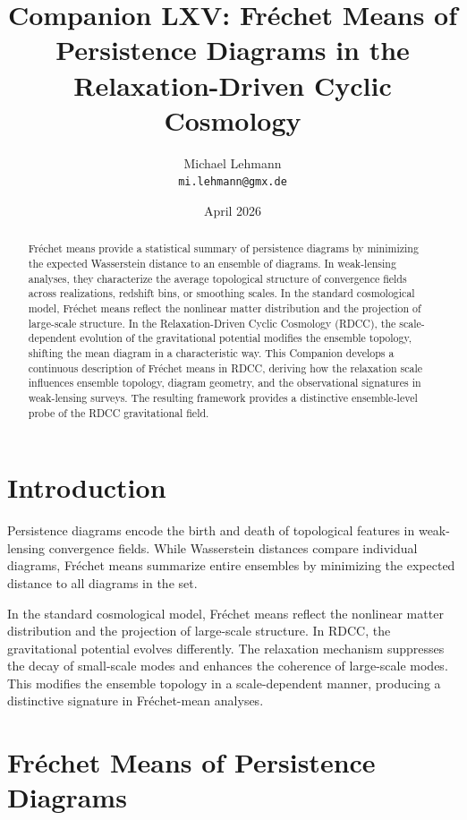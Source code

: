 \documentclass[11pt,a4paper]{article}
\title{\textbf{Companion LXV: Fréchet Means of Persistence Diagrams in the Relaxation-Driven Cyclic Cosmology}}
\author{Michael Lehmann \\ \texttt{mi.lehmann@gmx.de}}
\date{April 2026}
\begin{document}
\maketitle

\begin{abstract}
Fréchet means provide a statistical summary of persistence diagrams by minimizing 
the expected Wasserstein distance to an ensemble of diagrams. In weak-lensing 
analyses, they characterize the average topological structure of convergence 
fields across realizations, redshift bins, or smoothing scales. In the standard 
cosmological model, Fréchet means reflect the nonlinear matter distribution and the 
projection of large-scale structure. In the Relaxation-Driven Cyclic Cosmology 
(RDCC), the scale-dependent evolution of the gravitational potential modifies the 
ensemble topology, shifting the mean diagram in a characteristic way. This 
Companion develops a continuous description of Fréchet means in RDCC, deriving how 
the relaxation scale influences ensemble topology, diagram geometry, and the 
observational signatures in weak-lensing surveys. The resulting framework provides 
a distinctive ensemble-level probe of the RDCC gravitational field.
\end{abstract}
\section{Introduction}

Persistence diagrams encode the birth and death of topological features in 
weak-lensing convergence fields. While Wasserstein distances compare individual 
diagrams, Fréchet means summarize entire ensembles by minimizing the expected 
distance to all diagrams in the set.

In the standard cosmological model, Fréchet means reflect the nonlinear matter 
distribution and the projection of large-scale structure. In RDCC, the 
gravitational potential evolves differently. The relaxation mechanism suppresses 
the decay of small-scale modes and enhances the coherence of large-scale modes. 
This modifies the ensemble topology in a scale-dependent manner, producing a 
distinctive signature in Fréchet-mean analyses.
\section{Fréchet Means of Persistence Diagrams}
\end{document}
